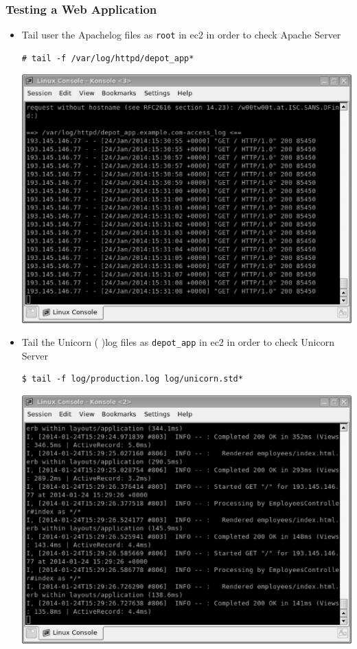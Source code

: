 \documentclass{beamer}
\begin{document}
\begin{frame}
\frametitle{Testing a Web Application}
\begin{itemize}
\item Tail user the Apachelog files  as \texttt{root}  in \acrshort{ec2} in order to check Apache Server
\lstset{language=shell}
\begin{lstlisting}[escapechar=!]
# tail -f /var/log/httpd/depot_app*
\end{lstlisting}
\includegraphics[scale=0.25]{logapache.eps}

\item Tail the Unicorn ( )log files as \texttt{depot\_app} in \acrshort{ec2} in order to check Unicorn Server
\lstset{language=shell}
\begin{lstlisting}[escapechar=!]
$ tail -f log/production.log log/unicorn.std*
\end{lstlisting}
\includegraphics[scale=0.25]{lograils.eps}


\end{itemize}
\end{frame}
\end{document}

